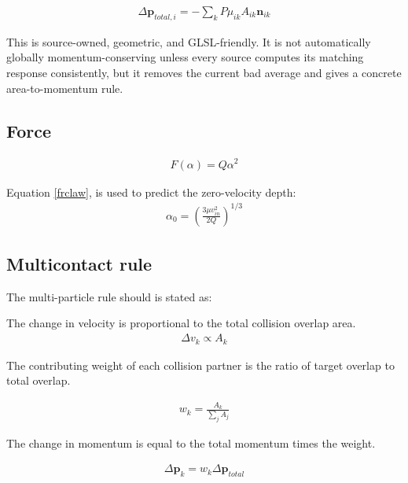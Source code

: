 \begin{equation}
\begin{aligned}
\label{none}
\Delta \mathbf{p}_{total,i}=-\sum_k P \mu_{ik} A_{ik} \mathbf{n}_{ik}
\end{aligned}
\end{equation}


This is source-owned, geometric, and GLSL-friendly. It is not automatically globally momentum-conserving unless every source computes its matching response consistently, but it removes the current bad average and gives a concrete area-to-momentum rule.







\subsection{Force}

\begin{equation}
\begin{aligned}
\label{frclaw}
F(\alpha) = Q\alpha^2
\end{aligned}
\end{equation}

Equation \ref{frclaw}, is used to predict the zero-velocity depth: 
\begin{equation}
\begin{aligned}
\label{zerodepth}
\alpha_0 =
\left(\frac{3\mu v_{in}^2}{2Q}\right)^{1/3}
\end{aligned}
\end{equation}


\subsection{Multicontact rule}

The multi-particle rule should is stated as:

The change in velocity is proportional to the total collision overlap area. 
\begin{equation}
\begin{aligned}
\label{mc}
\Delta v_k \propto A_k
\end{aligned}
\end{equation}

The contributing weight of each collision partner is the ratio of target overlap to total overlap.

\begin{equation}
\begin{aligned}
\label{mc}
w_k = \frac{A_k}{\sum_j A_j}
\end{aligned}
\end{equation}

The change in momentum is equal to the total momentum times the weight.

\begin{equation}
\begin{aligned}
\label{mca}
\Delta \mathbf{p}_k = w_k \Delta \mathbf{p}_{total}
\end{aligned}
\end{equation}
